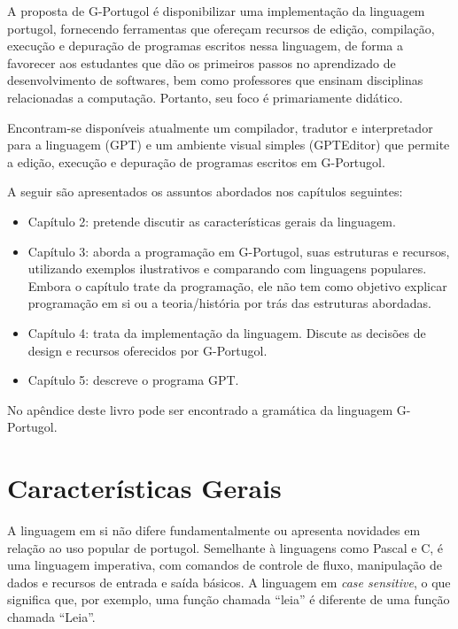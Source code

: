 \documentclass[a4paper,11pt]{report}
\begin{document}
A proposta de G-Portugol é disponibilizar uma implementação da linguagem
portugol, fornecendo ferramentas que ofereçam recursos de edição, compilação,
execução e depuração de programas escritos nessa linguagem, de forma a favorecer
aos estudantes que dão os primeiros passos no aprendizado de desenvolvimento de
softwares, bem como professores que ensinam disciplinas relacionadas a
computação. Portanto, seu foco é primariamente didático.

Encontram-se disponíveis atualmente um compilador, tradutor e interpretador para
a linguagem (GPT) e um ambiente visual simples (GPTEditor) que permite a edição,
execução e depuração de programas escritos em G-Portugol.

A seguir são apresentados os assuntos abordados nos capítulos seguintes:

\begin{itemize}
  \item Capítulo 2: pretende discutir as características gerais da linguagem.
  \item Capítulo 3: aborda a programação em G-Portugol, suas estruturas e
    recursos, utilizando exemplos ilustrativos e comparando com linguagens
    populares. Embora o capítulo trate da programação, ele não tem como objetivo
    explicar programação em si ou a teoria/história por trás das estruturas
    abordadas.
  \item Capítulo 4: trata da implementação da linguagem. Discute as decisões de
    design e recursos oferecidos por G-Portugol.
  \item Capítulo 5: descreve o programa GPT.
\end{itemize}

No apêndice deste livro pode ser encontrado a gramática da linguagem G-Portugol.


\chapter{Características Gerais}

A linguagem em si não difere fundamentalmente ou apresenta novidades em relação
ao uso popular de portugol. Semelhante à linguagens como Pascal e C, é uma
linguagem imperativa, com comandos de controle de fluxo, manipulação de dados e
recursos de entrada e saída básicos. A linguagem em \textit{case sensitive}, o
que significa que, por exemplo, uma função chamada ``leia'' é diferente de uma
função chamada ``Leia''.
\end{document}
